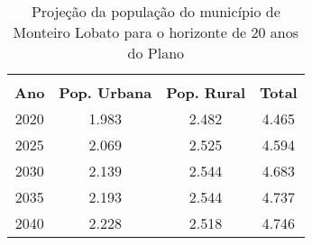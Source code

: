 \begin{table}[htbp]
  \centering
  \caption{Projeção da população do município de Monteiro Lobato para o horizonte de 20 anos do Plano}
    \begin{tabular}{c|c|c|c}
    \rowcolor[rgb]{ .969,  .588,  .275} \multicolumn{4}{c}{\textcolor[rgb]{ 1,  1,  1}{\textbf{Projeção populacional}}}\\
    \rowcolor[rgb]{ .984,  .831,  .706} \textbf{Ano} & \textbf{Pop. Urbana} & \textbf{Pop. Rural} & \textbf{Total} \\
    \rowcolor[rgb]{ .992,  .914,  .851} 2020  & 1.983  & 2.482  & 4.465 \\
    \rowcolor[rgb]{ .984,  .831,  .706} 2025  & 2.069  & 2.525  & 4.594 \\
    \rowcolor[rgb]{ .992,  .914,  .851} 2030  & 2.139  & 2.544  & 4.683 \\
    \rowcolor[rgb]{ .984,  .831,  .706} 2035  & 2.193  & 2.544  & 4.737 \\
    \rowcolor[rgb]{ .992,  .914,  .851} 2040  & 2.228  & 2.518  & 4.746 \\
    \end{tabular}%
  \label{tab:proj_pop}%
\end{table}%
